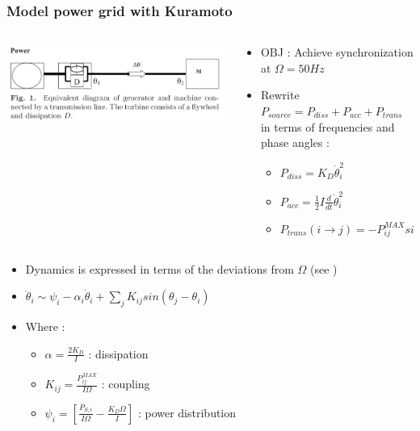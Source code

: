 \documentclass[xcolor=dvipsnames]{beamer}
\begin{document}
\begin{frame}
	\frametitle{Model power grid with Kuramoto}
	
	\begin{small}
	\begin{columns}
		\begin{column}{.45\textwidth}
			\includegraphics[scale=.45]{line}
		\end{column}
		\begin{column}{.55\textwidth}
			\begin{itemize}
				\item OBJ : Achieve synchronization at $ \Omega = 50Hz $
				\item Rewrite $ P_{source} = P_{diss} + P_{acc} + P_{trans} $ in terms of frequencies and phase angles :
				\begin{itemize}
					\item $ P_{diss} = K_D \dot{\theta}_i^2	$
					\item $ P_{acc} = \frac{1}{2}I\frac{d}{dt}\dot{\theta}_i^2 $	
					\item $P_{trans}(i \rightarrow j) = -P_{ij}^{MAX} sin(\theta_j-\theta_i) $ 
				\end{itemize}
			\end{itemize}
		\end{column}
	\end{columns}
	\begin{itemize}
		\item Dynamics is expressed in terms of the deviations from $ \Omega $ (see )
		\item $ \ddot{\theta}_i \sim \psi_i - \alpha_i \dot{\theta}_i + \sum_{j}K_{ij} sin(\theta_j-\theta_i) $
		\item Where :
			\begin{itemize}
				\item $ \alpha = \frac{2K_D}{I} $ : dissipation
				\item $ K_{ij} = \frac{P_{ij}^{MAX}}{I\Omega} $ : coupling
				\item $ \psi_i = \left[ \frac{P_{S,i}}{I\Omega} - \frac{K_D\Omega}{I} \right] $ : power distribution
			\end{itemize} 
		
	\end{itemize}
	\end{small}
\end{frame}
\end{document}
